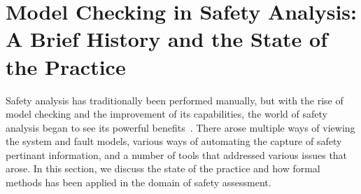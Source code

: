 \section{Model Checking in Safety Analysis: A Brief History and the State of the Practice}
\label{sec:modelCheckingInSA}
Safety analysis has traditionally been performed manually, but with the rise of model checking and the improvement of its capabilities, the world of safety analysis began to see its powerful benefits~\cite{hinchey2012industrial, liggesmeyer1998improving, coudert1993fault, Bozzano:2010:DSA:1951720,bozzano2003esacs}. There arose multiple ways of viewing the system and fault models, various ways of automating the capture of safety pertinant information, and a number of tools that addressed various issues that arose. In this section, we discuss the state of the practice and how formal methods has been applied in the domain of safety assessment.
